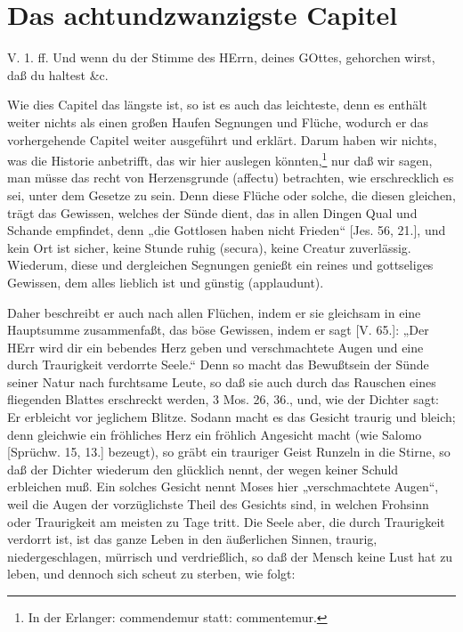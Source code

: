 \section{Das achtundzwanzigste Capitel}

\begin{schriftzitat}
V. 1. ff. Und wenn du der Stimme des HErrn, deines GOttes, gehorchen wirst, daß du haltest \&c.
\end{schriftzitat}

Wie dies Capitel das längste ist, so ist es auch das leichteste, denn es enthält weiter nichts als einen großen Haufen Segnungen und Flüche, wodurch er das vorhergehende Capitel weiter ausgeführt und erklärt. Darum haben wir nichts, was die Historie anbetrifft, das wir hier auslegen könnten,\footnote{In der Erlanger: commendemur statt: commentemur.} nur daß wir sagen, man müsse das recht von Herzensgrunde (affectu) betrachten,
wie erschrecklich es sei, unter dem Gesetze zu sein. Denn diese Flüche oder solche, die diesen gleichen, trägt das Gewissen, welches der Sünde dient, das in allen Dingen Qual und Schande empfindet, denn „die Gottlosen haben nicht Frieden“ [Jes. 56, 21.], und kein Ort ist sicher, keine Stunde ruhig (secura), keine Creatur zuverlässig. Wiederum, diese und dergleichen Segnungen genießt ein reines und gottseliges Gewissen, dem alles lieblich ist und günstig (applaudunt).

Daher beschreibt er auch nach allen Flüchen, indem er sie gleichsam in eine Hauptsumme zusammenfaßt, das böse Gewissen, indem er sagt [V. 65.]: „Der HErr wird dir ein bebendes Herz geben und verschmachtete Augen und eine durch Traurigkeit verdorrte Seele.“ Denn so macht das Bewußtsein der Sünde seiner Natur nach furchtsame Leute, so daß sie auch durch das Rauschen eines fliegenden Blattes erschreckt werden, 3 Mos. 26, 36., und, wie der Dichter sagt: Er erbleicht vor jeglichem Blitze. Sodann macht es das Gesicht traurig und bleich; denn gleichwie ein fröhliches Herz ein fröhlich Angesicht macht (wie Salomo [Sprüchw. 15, 13.] bezeugt), so gräbt ein trauriger Geist Runzeln in die Stirne, so daß der Dichter wiederum den glücklich nennt, der wegen keiner Schuld erbleichen muß. Ein solches Gesicht nennt Moses hier „verschmachtete Augen“, weil die Augen der vorzüglichste Theil des Gesichts sind, in welchen Frohsinn oder Traurigkeit am meisten zu Tage tritt. Die Seele aber, die durch Traurigkeit verdorrt ist, ist das ganze Leben in den äußerlichen Sinnen, traurig, niedergeschlagen, mürrisch und verdrießlich, so daß der Mensch keine Lust hat zu leben, und dennoch sich scheut zu sterben, wie folgt:

